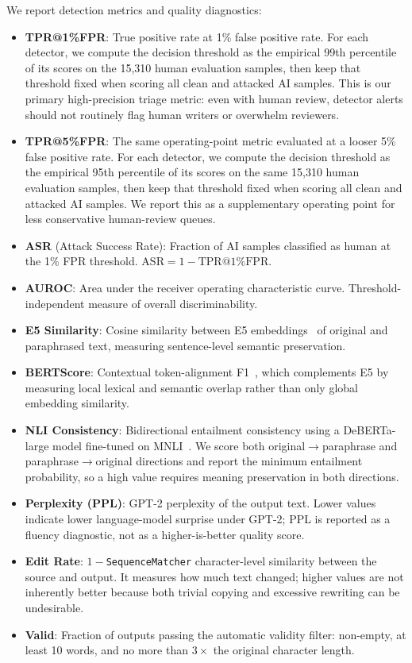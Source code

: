 \documentclass[11pt]{article}
\begin{document}
We report detection metrics and quality diagnostics:
\begin{itemize}[leftmargin=*,itemsep=2pt]
  \item \textbf{TPR@1\%FPR}: True positive rate at 1\% false positive rate. For each detector, we compute the decision threshold as the empirical 99th percentile of its scores on the 15,310 human evaluation samples, then keep that threshold fixed when scoring all clean and attacked AI samples. This is our primary high-precision triage metric: even with human review, detector alerts should not routinely flag human writers or overwhelm reviewers.
  \item \textbf{TPR@5\%FPR}: The same operating-point metric evaluated at a looser 5\% false positive rate. For each detector, we compute the decision threshold as the empirical 95th percentile of its scores on the same 15,310 human evaluation samples, then keep that threshold fixed when scoring all clean and attacked AI samples. We report this as a supplementary operating point for less conservative human-review queues.
  \item \textbf{ASR} (Attack Success Rate): Fraction of AI samples classified as human at the 1\% FPR threshold. $\text{ASR} = 1 - \text{TPR@1\%FPR}$.
  \item \textbf{AUROC}: Area under the receiver operating characteristic curve. Threshold-independent measure of overall discriminability.
  \item \textbf{E5 Similarity}: Cosine similarity between E5 embeddings~\cite{wang2022e5} of original and paraphrased text, measuring sentence-level semantic preservation.
  \item \textbf{BERTScore}: Contextual token-alignment F1~\cite{zhang2020bertscore}, which complements E5 by measuring local lexical and semantic overlap rather than only global embedding similarity.
  \item \textbf{NLI Consistency}: Bidirectional entailment consistency using a DeBERTa-large model fine-tuned on MNLI~\cite{he2021deberta}. We score both original$\rightarrow$paraphrase and paraphrase$\rightarrow$original directions and report the minimum entailment probability, so a high value requires meaning preservation in both directions.
  \item \textbf{Perplexity (PPL)}: GPT-2 perplexity of the output text. Lower values indicate lower language-model surprise under GPT-2; PPL is reported as a fluency diagnostic, not as a higher-is-better quality score.
  \item \textbf{Edit Rate}: $1-$\texttt{SequenceMatcher} character-level similarity between the source and output. It measures how much text changed; higher values are not inherently better because both trivial copying and excessive rewriting can be undesirable.
  \item \textbf{Valid}: Fraction of outputs passing the automatic validity filter: non-empty, at least 10 words, and no more than $3\times$ the original character length.
\end{itemize}
\end{document}
